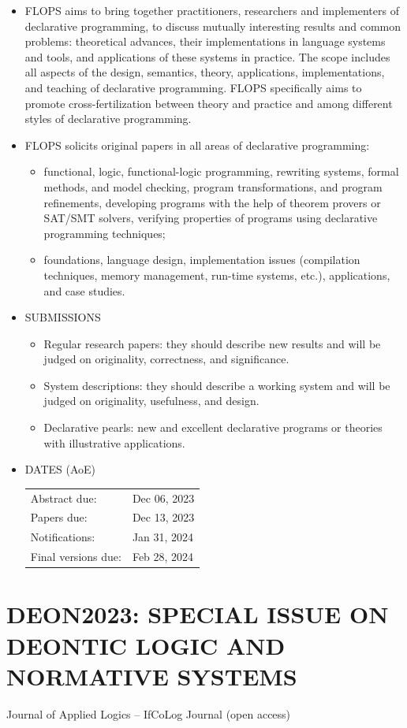 \documentclass[prodmode,acmtecs]{acmsmall} %
\begin{document}
\begin{itemize}\item  FLOPS aims to bring together practitioners, researchers and implementers of declarative programming, to discuss mutually interesting results and common problems: theoretical advances, their implementations in language systems and tools, and applications of these systems in practice. The scope includes all aspects of the design, semantics, theory, applications, implementations, and teaching of declarative programming. FLOPS specifically aims to promote cross-fertilization between theory and practice and among different styles of declarative programming. 
 
\item  FLOPS solicits original papers in all areas of declarative programming: 
 
\begin{itemize}\item  functional, logic, functional-logic programming, rewriting systems, formal methods, and model checking, program transformations, and program refinements, developing programs with the help of theorem provers or SAT/SMT solvers, verifying properties of programs using declarative programming techniques;
\item  foundations, language design, implementation issues (compilation techniques, memory management, run-time systems, etc.),     applications, and case studies.
\end{itemize} 
\item  SUBMISSIONS 
 
\begin{itemize}\item  Regular research papers: they should describe new results and will be judged on originality, correctness, and significance.
\item  System descriptions: they should describe a working system and will be judged on originality, usefulness, and design.
\item  Declarative pearls: new and excellent declarative programs or theories with illustrative applications.
\end{itemize} 
\item  DATES (AoE) 
 
\begin{tabulary}{\linewidth}{LL}Abstract due:  & Dec 06, 2023 \\
Papers due:  & Dec 13, 2023 \\
Notifications:  & Jan 31, 2024 \\
Final versions due:  & Feb 28, 2024 \\
\end{tabulary}
 
\end{itemize}\section{DEON2023: SPECIAL ISSUE ON DEONTIC LOGIC AND NORMATIVE SYSTEMS}\label{DEON2023}  Journal of Applied Logics – IfCoLog Journal (open access)\\ 
\end{document}
